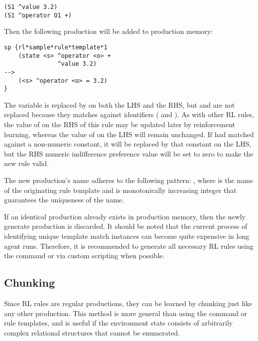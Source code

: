 \begin{verbatim}
(S1 ^value 3.2)
(S1 ^operator O1 +)
\end{verbatim}

Then the following production will be added to production memory:

\begin{verbatim}
sp {rl*sample*rule*template*1
    (state <s> ^operator <o> +
               ^value 3.2)
-->
    (<s> ^operator <o> = 3.2)
}
\end{verbatim}

The variable  is replaced by  on both the LHS and the RHS, but  and  are not replaced because they matches against identifiers ( and ).
As with other RL rules, the value of  on the RHS of this rule may be updated later by reinforcement learning, whereas the value of  on the LHS will remain unchanged.
If  had matched against a non-numeric constant, it will be replaced by that constant on the LHS, but the RHS numeric indifference preference value will be set to zero to make the new rule valid.

The new production's name adheres to the following pattern:
, where  is the name of the originating rule template and  is monotonically increasing integer that guarantees the uniqueness of the name.

If an identical production already exists in production memory, then the newly generate production is discarded.
It should be noted that the current process of identifying unique template match instances can become quite expensive in long agent runs.
Therefore, it is recommended to generate all necessary RL rules using the  command or via custom scripting when possible.

\subsection{Chunking}
Since RL rules are regular productions, they can be learned by chunking just like any other production.
This method is more general than using the  command or rule templates, and is useful if the environment state consists of arbitrarily complex relational structures that cannot be enumerated.

